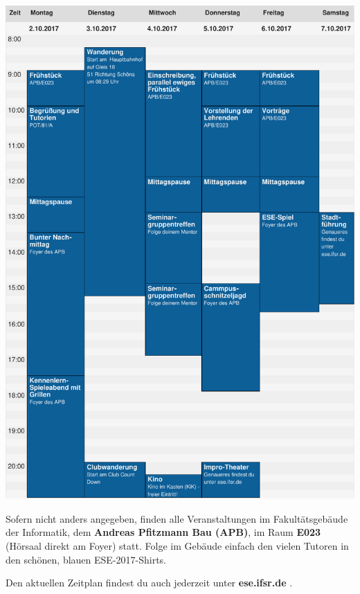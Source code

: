 \begin{center}
  \vspace*{-6.5em}
  \includegraphics[height=.77\dimen108,keepaspectratio]{img/zeitplan.pdf}%
  
  \small
  \vfill
  \enlargethispage{2em}
  
  Sofern nicht anders angegeben, finden alle Veranstaltungen im Fakultätsgebäude der Informatik, dem
  \textbf{Andreas Pfitzmann Bau (APB)}, im Raum \textbf{E023} (Hörsaal direkt am Foyer) statt.
  Folge im Gebäude einfach den vielen Tutoren in den schönen, blauen ESE-2017-Shirts.

  Den aktuellen Zeitplan findest du auch jederzeit unter \textbf{ese.ifsr.de} .
\end{center}
